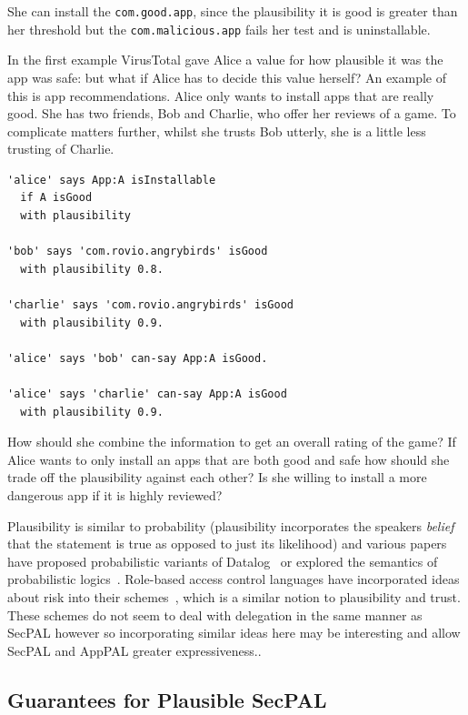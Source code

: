 \documentclass[thesis.tex]{subfiles}
\begin{document}
She can install the \texttt{com.good.app}, since the plausibility it is good is
greater than her threshold but the \texttt{com.malicious.app} fails her test and
is uninstallable. 

In the first example VirusTotal gave Alice a value for how plausible it was the
app was safe: but what if Alice has to decide this value herself? An example of
this is app recommendations. Alice only wants to install apps that are really
good. She has two friends, Bob and Charlie, who offer her reviews of a game. To
complicate matters further, whilst she trusts Bob utterly, she is a little less
trusting of Charlie.

\begin{lstlisting}
'alice' says App:A isInstallable
  if A isGood
  with plausibility

'bob' says 'com.rovio.angrybirds' isGood
  with plausibility 0.8.

'charlie' says 'com.rovio.angrybirds' isGood
  with plausibility 0.9.

'alice' says 'bob' can-say App:A isGood.

'alice' says 'charlie' can-say App:A isGood
  with plausibility 0.9.
\end{lstlisting}

How should she combine the information to get an overall rating of the game? If
Alice wants to only install an apps that are both good and safe how should she
trade off the plausibility against each other? Is she willing to install a more
dangerous app if it is highly reviewed?

Plausibility is similar to probability (plausibility incorporates the speakers
\emph{belief} that the statement is true as opposed to just its likelihood) and
various papers have proposed probabilistic variants of
Datalog~\cite{fuhr_probabilistic_1995} or explored the semantics of
probabilistic logics~\cite{halpern_analysis_1990}. Role-based access control
languages have incorporated ideas about risk into their
schemes~\cite{josang_analysing_2004,dimmock_using_2004,salim_approach_2011},
which is a similar notion to plausibility and trust. These schemes do not seem
to deal with delegation in the same manner as SecPAL however so incorporating
similar ideas here may be interesting and allow SecPAL and AppPAL greater
expressiveness..

\subsection{Guarantees for Plausible SecPAL} 
\end{document}
